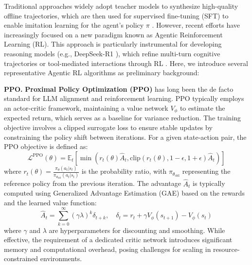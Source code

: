 \documentclass{llmxive}
\begin{document}
Traditional approaches widely adopt teacher models to synthesize high-quality offline trajectories, which are then used for supervised fine-tuning (SFT) to enable imitation learning for the agent's policy $\pi$ \cite{ToolBench, Toolformer, Self-Improvement}. However, recent efforts have increasingly focused on a new paradigm known as Agentic Reinforcement Learning (RL).
This approach is particularly instrumental for developing reasoning models (e.g., DeepSeek-R1 \cite{DeepSeek-R1}), which refine multi-turn cognitive trajectories or tool-mediated interactions through RL \cite{GiGPO, ARPO, Search-r1}. Here, we introduce several representative Agentic RL algorithms as preliminary background:

\textbf{PPO.} \textbf{Proximal Policy Optimization (PPO)} \cite{PPO} has long been the de facto standard for LLM alignment and reinforcement learning. PPO typically employs an actor-critic framework, maintaining a value network $V_\phi$ to estimate the expected return, which serves as a baseline for variance reduction. The training objective involves a clipped surrogate loss to ensure stable updates by constraining the policy shift between iterations. For a given state-action pair, the PPO objective is defined as:
\begin{equation}
\mathcal{L}^{\text{PPO}}(\theta) = \mathbb{E}_{t} \left[ \min(r_t(\theta) \hat{A}_t, \text{clip}(r_t(\theta), 1-\epsilon, 1+\epsilon) \hat{A}_t) \right]
\end{equation}
where $r_t(\theta) = \frac{\pi_\theta(a_t|s_t)}{\pi_{\theta_{\text{old}}}(a_t|s_t)}$ is the probability ratio, with $\pi_{\theta_{\text{old}}}$ representing the reference policy from the previous iteration.
The advantage $\hat{A}_t$ is typically computed using Generalized Advantage Estimation (GAE) based on the rewards and the learned value function:
\begin{equation}
\hat{A}_t = \sum_{k=0}^{\infty} (\gamma \lambda)^k \delta_{t+k}, \quad \delta_t = r_t + \gamma V_\phi(s_{t+1}) - V_\phi(s_t)
\end{equation}
where $\gamma$ and $\lambda$ are hyperparameters for discounting and smoothing. While effective, the requirement of a dedicated critic network introduces significant memory and computational overhead, posing challenges for scaling in resource-constrained environments.
\end{document}

